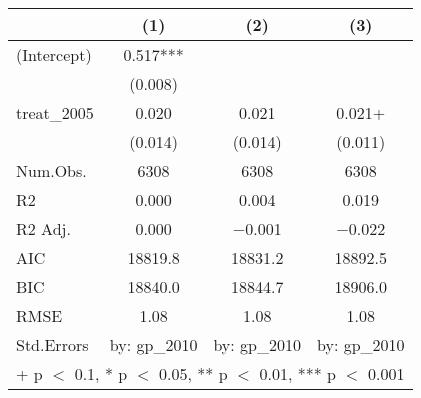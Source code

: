 \begin{table}
\centering
\begin{tabular}[t]{lccc}
\toprule
  & (1) & (2) & (3)\\
\midrule
(Intercept) & \num{0.517}*** &  & \\
 & (\num{0.008}) &  & \\
treat\_2005 & \num{0.020} & \num{0.021} & \num{0.021}+\\
 & (\num{0.014}) & (\num{0.014}) & (\num{0.011})\\
\midrule
Num.Obs. & \num{6308} & \num{6308} & \num{6308}\\
R2 & \num{0.000} & \num{0.004} & \num{0.019}\\
R2 Adj. & \num{0.000} & \num{-0.001} & \num{-0.022}\\
AIC & \num{18819.8} & \num{18831.2} & \num{18892.5}\\
BIC & \num{18840.0} & \num{18844.7} & \num{18906.0}\\
RMSE & \num{1.08} & \num{1.08} & \num{1.08}\\
Std.Errors & by: gp\_2010 & by: gp\_2010 & by: gp\_2010\\
\bottomrule
\multicolumn{4}{l}{\rule{0pt}{1em}+ p $<$ 0.1, * p $<$ 0.05, ** p $<$ 0.01, *** p $<$ 0.001}\\
\end{tabular}
\end{table}
